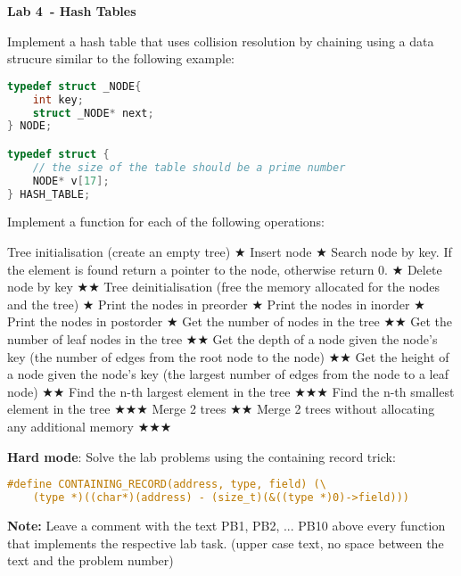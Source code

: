 \documentclass{exam}
\newcommand\labnr{4}
\newcommand\lab{Lab \labnr\ - Hash Tables}
\newcommand\lvlez{$\bigstar$}
\newcommand\lvlmed{\lvlez\lvlez}
\newcommand\lvlhard{\lvlmed\lvlez}
\begin{document}
\begin{center}
    \vspace*{0cm}
    \bfseries\LARGE
    \lab
    \vspace*{1cm}
\end{center}

\noindent Implement a hash table that uses collision resolution by chaining using a data strucure similar to the following example:

\begin{lstlisting}[language=C]
typedef struct _NODE{
    int key;
    struct _NODE* next;
} NODE;

typedef struct {
    // the size of the table should be a prime number 
    NODE* v[17];
} HASH_TABLE;
\end{lstlisting}


\bigskip
\noindent Implement a function for each of the following operations:

\begin{questions}
\question Tree initialisation (create an empty tree) \lvlez
\question Insert node \lvlez
\question Search node by key. If the element is found return a pointer to the node, otherwise return 0. \lvlez
\question Delete node by key \lvlmed
\question Tree deinitialisation (free the memory allocated for the nodes and the tree) \lvlez
\question Print the nodes in preorder \lvlez
\question Print the nodes in inorder \lvlez
\question Print the nodes in postorder \lvlez
\question Get the number of nodes in the tree \lvlmed
\question Get the number of leaf nodes in the tree \lvlmed
\question Get the depth of a node given the node's key (the number of edges from the root node to the node) \lvlmed
\question Get the height of a node given the node's key (the largest number of edges from the node to a leaf node) \lvlmed
\question Find the n-th largest element in the tree \lvlhard
\question Find the n-th smallest element in the tree \lvlhard
\question Merge 2 trees \lvlmed
\question Merge 2 trees without allocating any additional memory \lvlhard
\end{questions}

\bigskip
\noindent\textbf{Hard mode}: Solve the lab problems using the containing record trick:
\begin{lstlisting}[language=C]
#define CONTAINING_RECORD(address, type, field) (\
    (type *)((char*)(address) - (size_t)(&((type *)0)->field)))
\end{lstlisting}
\textbf{Note:} Leave a comment with the text PB1, PB2, ... PB10 above every function that implements the respective lab task. (upper case text, no space between the text and the problem number)

\medskip
\printbibliography
\end{document}
